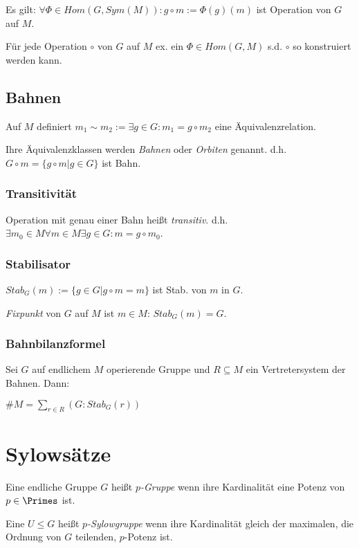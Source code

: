 Es gilt: $\forall \Phi \in Hom(G,Sym(M)) : g \circ m := \Phi(g)(m)$ ist Operation von $G$ auf $M$.

Für jede Operation $\circ$ von $G$ auf $M$ ex. ein $\Phi \in Hom(G,M)$ s.d. $\circ$ so konstruiert werden kann.

\subsection*{Bahnen}

Auf $M$ definiert $m_1 \sim m_2 := \exists g \in G : m_1 = g \circ m_2$ eine Äquivalenzrelation.

Ihre Äquivalenzklassen werden \emph{Bahnen} oder \emph{Orbiten} genannt. d.h. $G \circ m = \{ g \circ m | g \in G \}$ ist Bahn.

\subsubsection*{Transitivität}

Operation mit genau einer Bahn heißt \emph{transitiv}. d.h. $\exists m_0 \in M \forall m \in M \exists g \in G : m = g \circ m_0$.

\subsubsection*{Stabilisator}

$Stab_G(m) := \{ g \in G | g \circ m = m \}$ ist Stab. von $m$ in $G$.

\emph{Fixpunkt} von $G$ auf $M$ ist $m \in M$: $Stab_G(m) = G$.

\subsubsection*{Bahnbilanzformel}

Sei $G$ auf endlichem $M$ operierende Gruppe und $R \subseteq M$ ein Vertretersystem der Bahnen. Dann:

$\#M = \sum_{r \in R} (G : Stab_G(r))$

\section*{Sylowsätze}

Eine endliche Gruppe $G$ heißt \emph{$p$-Gruppe} wenn ihre Kardinalität eine Potenz von $p \in \Primes$ ist.

Eine $U \leq G$ heißt \emph{$p$-Sylowgruppe} wenn ihre Kardinalität gleich der maximalen, die Ordnung von $G$ teilenden, $p$-Potenz ist.

